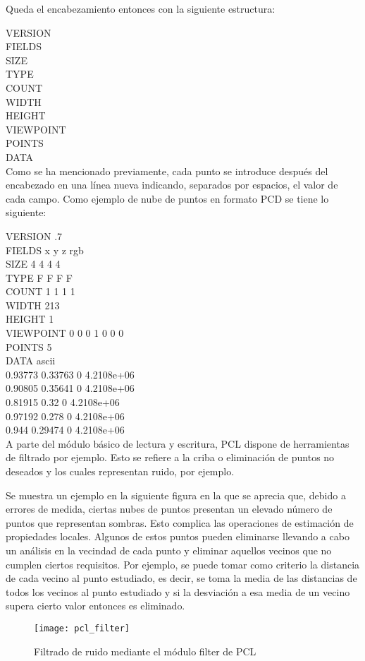 
Queda el encabezamiento entonces con la siguiente estructura:

VERSION\\
FIELDS\\
SIZE\\
TYPE\\
COUNT\\
WIDTH\\
HEIGHT\\
VIEWPOINT\\
POINTS\\
DATA\\

Como se ha mencionado previamente, cada punto se introduce después del encabezado en una línea nueva indicando, separados por espacios, el valor de cada campo. Como ejemplo de nube de puntos en formato PCD se tiene lo siguiente:

VERSION .7\\
FIELDS x y z rgb\\
SIZE 4 4 4 4\\
TYPE F F F F\\
COUNT 1 1 1 1\\
WIDTH 213\\
HEIGHT 1\\
VIEWPOINT 0 0 0 1 0 0 0\\
POINTS 5\\
DATA ascii\\
0.93773 0.33763 0 4.2108e+06\\
0.90805 0.35641 0 4.2108e+06\\
0.81915 0.32 0 4.2108e+06\\
0.97192 0.278 0 4.2108e+06\\
0.944 0.29474 0 4.2108e+06\\

A parte del módulo básico de lectura y escritura, PCL dispone de herramientas de filtrado por ejemplo. Esto se refiere a la criba o eliminación de puntos no deseados y los cuales representan ruido, por ejemplo.

Se muestra un ejemplo en la siguiente figura en la que se aprecia que, debido a errores de medida, ciertas nubes de puntos presentan un elevado número de puntos que representan sombras. Esto complica las operaciones de estimación de propiedades locales. Algunos de estos puntos pueden eliminarse llevando a cabo un análisis en la vecindad de cada punto y eliminar aquellos vecinos que no cumplen ciertos requisitos. Por ejemplo, se puede tomar como criterio la distancia de cada vecino al punto estudiado, es decir, se toma la media de las distancias de todos los vecinos al punto estudiado y si la desviación a esa media de un vecino supera cierto valor entonces es eliminado.
\begin{figure}
\centering
{}
  \texttt{[image: pcl\_filter]}
  \caption{Filtrado de ruido mediante el módulo filter de PCL}\label{fig:pcl_filter}
\endminipage\hfill
\end{figure}

